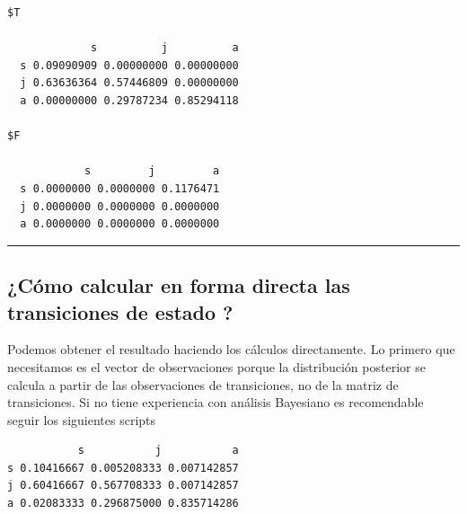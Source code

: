 \documentclass[
  12pt,
  letterpaper,
]{book}
\newenvironment{Shaded}{\begin{snugshade}}{\end{snugshade}}
\newcommand{\CommentTok}[1]{\textcolor[rgb]{0.37,0.37,0.37}{#1}}
\newcommand{\DecValTok}[1]{\textcolor[rgb]{0.68,0.00,0.00}{#1}}
\newcommand{\FloatTok}[1]{\textcolor[rgb]{0.68,0.00,0.00}{#1}}
\newcommand{\FunctionTok}[1]{\textcolor[rgb]{0.28,0.35,0.67}{#1}}
\newcommand{\NormalTok}[1]{\textcolor[rgb]{0.00,0.23,0.31}{#1}}
\newcommand{\OtherTok}[1]{\textcolor[rgb]{0.00,0.23,0.31}{#1}}
\newcommand{\SpecialCharTok}[1]{\textcolor[rgb]{0.37,0.37,0.37}{#1}}
\newcommand{\StringTok}[1]{\textcolor[rgb]{0.13,0.47,0.30}{#1}}
\begin{document}
\begin{verbatim}
$T
   
             s          j          a
  s 0.09090909 0.00000000 0.00000000
  j 0.63636364 0.57446809 0.00000000
  a 0.00000000 0.29787234 0.85294118

$F
   
            s         j         a
  s 0.0000000 0.0000000 0.1176471
  j 0.0000000 0.0000000 0.0000000
  a 0.0000000 0.0000000 0.0000000
\end{verbatim}

\begin{center}\rule{0.5\linewidth}{0.5pt}\end{center}

\subsection{¿Cómo calcular en forma directa las transiciones de estado
?}\label{cuxf3mo-calcular-en-forma-directa-las-transiciones-de-estado}

Podemos obtener el resultado haciendo los cálculos directamente. Lo
primero que necesitamos es el vector de observaciones porque la
distribución posterior se calcula a partir de las observaciones de
transiciones, no de la matriz de transiciones. Si no tiene experiencia
con análisis Bayesiano es recomendable seguir los siguientes scripts

\begin{Shaded}
\end{Shaded}

\begin{verbatim}
           s           j           a
s 0.10416667 0.005208333 0.007142857
j 0.60416667 0.567708333 0.007142857
a 0.02083333 0.296875000 0.835714286
\end{verbatim}
\end{document}
